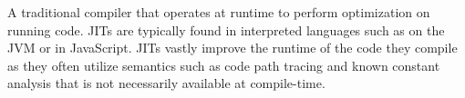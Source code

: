 \begin{definition}
    A traditional compiler that operates at runtime to perform optimization on running code. JITs are typically found in interpreted languages such as on the JVM or in JavaScript. JITs vastly improve the runtime of the code they compile as they often utilize semantics such as code path tracing and known constant analysis that is not necessarily available at compile-time. 
\end{definition}